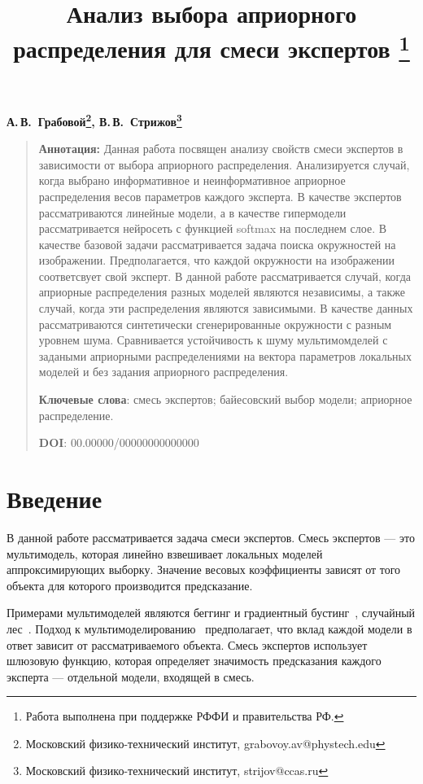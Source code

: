 \documentclass[12pt, twoside]{article}
\numberwithin{equation}{section}
\begin{document}
\title{\bf Анализ выбора априорного распределения для смеси экспертов \thanks{Работа выполнена при поддержке РФФИ и правительства РФ.}}
\date{}
\author{}
\maketitle

\begin{center}
\bf
А.\,В.~Грабовой\footnote{Московский физико-технический институт, grabovoy.av@phystech.edu}, В.\,В.~Стрижов\footnote{Московский физико-технический институт, strijov@ccas.ru}

\end{center}

{\centering\begin{quote}
\textbf{Аннотация:} 
Данная работа посвящен анализу свойств смеси экспертов в зависимости от выбора априорного распределения. Анализируется случай, когда выбрано информативное и неинформативное априорное распределения весов параметров каждого эксперта. В качестве экспертов рассматриваются линейные модели, а в качестве гипермодели рассматривается нейросеть с функцией softmax на последнем слое. В качестве базовой задачи рассматривается задача поиска окружностей на изображении. Предполагается, что каждой окружности на изображении соответсвует свой эксперт. В данной работе рассматривается случай, когда априорные распределения разных моделей являются независимы, а также случай, когда эти распределения являются зависимыми. В качестве данных рассматриваются синтетически сгенерированные окружности с разным уровнем шума. Сравнивается устойчивость к шуму мультимомделей с задаными априорными распределениями на вектора параметров локальных моделей и без задания априорного распределения.

\smallskip
\textbf{Ключевые слова}: смесь экспертов; байесовский выбор модели; априорное распределение.

\smallskip
\textbf{DOI}: 00.00000/00000000000000
\end{quote}
}

\section{Введение}
В данной работе рассматривается задача смеси экспертов. Смесь экспертов --- это мультимодель, которая линейно взвешивает локальных моделей аппроксимирующих выборку. Значение весовых коэффициенты зависят от того объекта для которого производится предсказание.

Примерами мультимоделей являются беггинг и градиентный бустинг~\cite{Tianqi2016}, случайный лес~\cite{Ishwaran2012}. Подход к мультимоделированию~\cite{Yuksel2012} предполагает, что вклад каждой модели в ответ зависит от рассматриваемого объекта. Смесь экспертов использует шлюзовую функцию, которая определяет значимость предсказания каждого эксперта --- отдельной модели, входящей в смесь.
\end{document}
